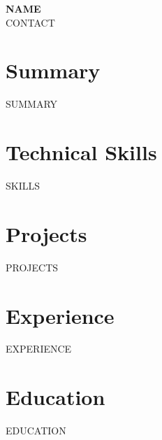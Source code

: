 \documentclass[10pt,letterpaper]{article}
\begin{document}
\begin{center}
  {\LARGE \textbf{{{NAME}}}}\\[3pt]
  {\small {{CONTACT}}}
\end{center}

\vspace{4pt}

\section*{Summary}
{{SUMMARY}}

\section*{Technical Skills}
{{SKILLS}}

\section*{Projects}
{{PROJECTS}}

\section*{Experience}
{{EXPERIENCE}}

\section*{Education}
{{EDUCATION}}
\end{document}
